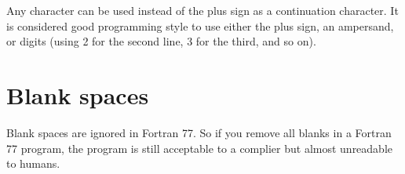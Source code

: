 Any character can be used instead of the plus sign as a continuation
character. It is considered good programming style to use either the
plus sign, an ampersand, or digits (using 2 for the second line, 3 for
the third, and so on).


\section*{Blank spaces}

Blank spaces are ignored in Fortran 77. So if you remove all blanks in a
Fortran 77 program, the program is still acceptable to a complier but
almost unreadable to humans.

\footer

